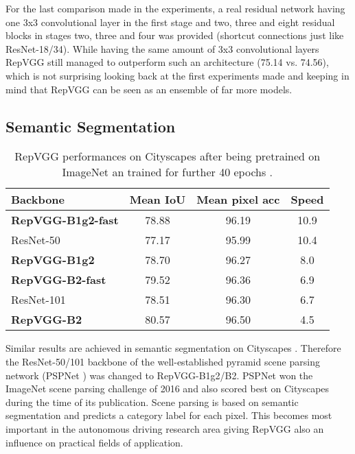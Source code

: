 For the last comparison made in the experiments, a real residual network having one 3x3 convolutional layer in the first stage and two, three and eight residual blocks in stages two, three and four was provided (shortcut connections just like ResNet-18/34). While having the same amount of 3x3 convolutional layers RepVGG still managed to outperform such an architecture (75.14 vs. 74.56), which is not surprising looking back at the first experiments made and keeping in mind that RepVGG can be seen as an ensemble of far more models. 

\subsection{Semantic Segmentation}

\setlength{\tabcolsep}{3pt}
\begin{table}
	\begin{center}
		\begin{tabular}{lccc} 
			\hline
			Backbone & Mean IoU & Mean pixel acc & Speed \\
			\hline
			\textbf{RepVGG-B1g2-fast} & 78.88 & 96.19 & 10.9 \\
			ResNet-50 & 77.17 & 95.99 & 10.4 \\
			\textbf{RepVGG-B1g2} & 78.70 & 96.27 & 8.0 \\
			\hline
			\textbf{RepVGG-B2-fast} & 79.52 & 96.36 & 6.9 \\
			ResNet-101 & 78.51 & 96.30 & 6.7 \\
			\textbf{RepVGG-B2} & 80.57 & 96.50 & 4.5 \\
			\hline
		\end{tabular}
	\end{center}
	\caption{RepVGG performances on Cityscapes \cite{MariusCordts.2016} after being pretrained on ImageNet \cite{JiaDeng.2009} an trained for further 40 epochs \cite{XiaohanDing.2021}.}
	\label{tab:results3}
\end{table}
\setlength{\tabcolsep}{6pt}

Similar results are achieved in semantic segmentation on Cityscapes \cite{MariusCordts.2016}. Therefore the ResNet-50/101 backbone of the well-established pyramid scene parsing network (PSPNet \cite{HengshuangZhao.2017}) was changed to RepVGG-B1g2/B2. PSPNet won the ImageNet scene parsing challenge of 2016 and also scored best on Cityscapes \cite{MariusCordts.2016} during the time of its publication. Scene parsing is based on semantic segmentation and predicts a category label for each pixel. This becomes most important in the autonomous driving research area giving RepVGG also an influence on practical fields of application. 

